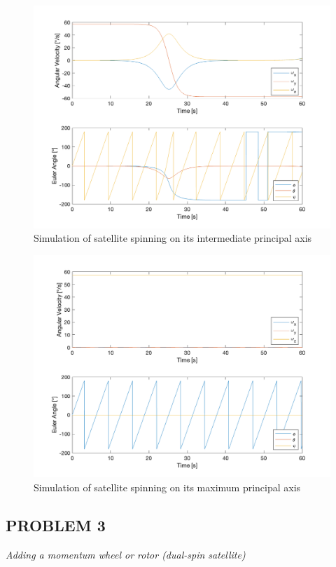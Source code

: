\begin{figure}[H]
\centering
\includegraphics[scale=0.6]{Images/ps4_problem2a_2.png}
\caption{Simulation of satellite spinning on its intermediate principal axis}
\label{fig:ps4_problem2a_2}
\end{figure}

\begin{figure}[H]
\centering
\includegraphics[scale=0.6]{Images/ps4_problem2a_3.png}
\caption{Simulation of satellite spinning on its maximum principal axis}
\label{fig:ps4_problem2a_3}
\end{figure}

\subsection{PROBLEM 3}
\textit{Adding a momentum wheel or rotor (dual-spin satellite)}

